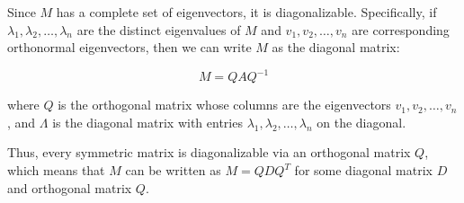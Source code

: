 \documentclass[fontsize=12pt]{scrartcl}
\begin{document}
\noindent
Since $M$ has a complete set of eigenvectors, it is diagonalizable. Specifically, if $\lambda_1, \lambda_2, \dots, \lambda_n$ are the distinct eigenvalues of $M$ and $v_1, v_2, \dots, v_n$ are corresponding orthonormal eigenvectors, then we can write $M$ as the diagonal matrix:

$$ M = QAQ^{-1}$$

\noindent
where $Q$ is the orthogonal matrix whose columns are the eigenvectors $v_1, v_2, \dots, v_n$, and $\Lambda$ is the diagonal matrix with entries $\lambda_1, \lambda_2, \dots, \lambda_n$ on the diagonal.

\noindent
Thus, every symmetric matrix is diagonalizable via an orthogonal matrix $Q$, which means that $M$ can be written as $M = Q D Q^T$ for some diagonal matrix $D$ and orthogonal matrix $Q$.
\end{document}
